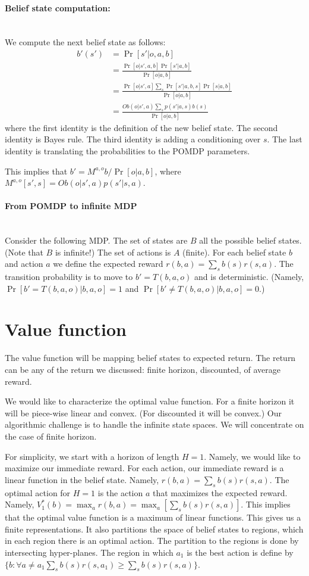\paragraph{Belief state computation:}\ \\
We compute the next belief state as follows:
\begin{align*}
b'(s') &= \Pr[s'|o,a,b]\\
&= \frac{\Pr[o|s',a,b]\Pr[s'|a,b]}{\Pr[o|a,b]}\\
&= \frac{\Pr[o|s',a]\sum_s \Pr[s'|a,b,s]\Pr[s|a,b]}{\Pr[o|a,b]}\\
&= \frac{Ob(o|s',a)\sum_s p(s'|a,s)b(s)}{\Pr[o|a,b]}
\end{align*}
where the first identity is the definition of the new belief state.
The second identity is Bayes rule. The third identity is adding a
conditioning over $s$. The last identity is translating the
probabilities to the POMDP parameters.

This implies that $b'=M^{a,o} b / \Pr[o|a,b]$, where $M^{a,o}[s',s]=Ob(o|s',a)p(s'|s,a)$.

\paragraph{From POMDP to infinite MDP}\ \\
Consider the following MDP. The set of states are $B$ all the
possible belief states. (Note that $B$ is infinite!) The set of
actions is $A$ (finite). For each belief state $b$ and action $a$ we
define the expected reward $r(b,a)=\sum_s b(s)r(s,a)$. The
transition probability is to move to $b'=T(b,a,o)$ and is
deterministic. (Namely, $\Pr[b'=T(b,a,o)|b,a,o]=1$ and $\Pr[b'\neq
T(b,a,o)|b,a,o]=0$.)


\section{Value function}
The value function will be mapping belief states to expected return.
The return can be any of the return we discussed: finite horizon,
discounted, of average reward.

We would like to characterize the optimal value function. For a
finite horizon it will be piece-wise linear and convex. (For
discounted it will be convex.) Our algorithmic challenge is to
handle the infinite state spaces. We will concentrate on the case of
finite horizon.

For simplicity, we start with a horizon of length $H=1$. Namely, we
would like to maximize our immediate reward. For each action, our
immediate reward is a linear function in the belief state. Namely,
$r(b,a)=\sum_s b(s)r(s,a)$. The optimal action for $H=1$ is the
action $a$ that maximizes the expected reward. Namely,
$V^*_1(b)=\max_a r(b,a)=\max_a [\sum_s b(s)r(s,a)]$. This implies
that the optimal value function is a maximum of linear functions.
This gives us a finite representations. It also partitions the space
of belief states to regions, which in each region there is an
optimal action. The partition to the regions is done by intersecting
hyper-planes. The region in which $a_1$ is the best action is define
by $\{b: \forall a\neq a_1 \sum_s b(s)r(s,a_1)\geq \sum_s
b(s)r(s,a)\}$.


